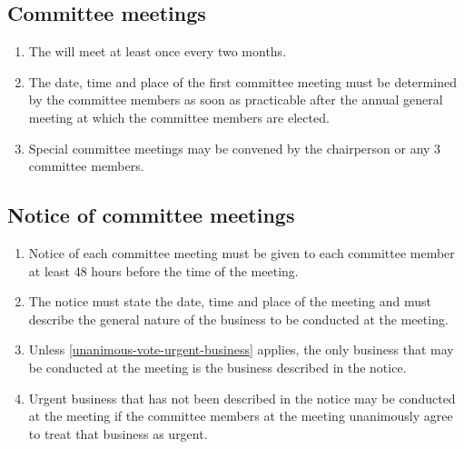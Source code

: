 \documentclass[../constitution.tex]{subfiles}
\begin{document}
\hypertarget{committee-meetings}{%
\subsection{Committee meetings}\label{committee-meetings}}

\begin{enumerate}

\item The  will meet at least once every two months.
\item \label{first-committee-meeting} The date, time and place of the first committee meeting must be determined by the committee members as soon as practicable after the annual general meeting at which the committee members are elected.


\item Special committee meetings may be convened by the chairperson or any 3 committee members.
\end{enumerate}

\hypertarget{notice-of-committee-meetings}{%
\subsection{Notice of committee meetings}\label{notice-of-committee-meetings}}

\begin{enumerate}

\item Notice of each committee meeting must be given to each committee member at least 48 hours before the time of the meeting.
\item The notice must state the date, time and place of the meeting  and must describe the general nature of the business to be conducted at the meeting.
\item Unless  \ref{unanimous-vote-urgent-business} applies, the only business that may be conducted at the meeting is the business described in the notice.
\item Urgent business that has not been described in the notice may be conducted at the meeting if the committee members at the meeting unanimously agree to treat that business as urgent. \label{unanimous-vote-urgent-business}
\end{enumerate}
\end{document}
